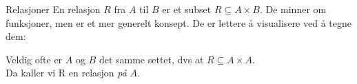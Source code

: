 \begin{frame}[fragile]{Relasjoner}
    En relasjon $R$ fra $A$ til $B$ er et subset $ R \subseteq A \times B$. De minner om funksjoner, men er et mer generelt konsept. De er lettere å visualisere ved å tegne dem:
    \begin{figure}
        \centering
        \qquad
        \qquad
        \qquad
        \label{fig:relasjoner}
    \end{figure} 

    \pause
    Veldig ofte er $A$ og $B$ det samme settet, dvs at $R \subseteq A \times A$.\\ 
    Da kaller vi R en relasjon \emph{på} $A$.
\end{frame}

